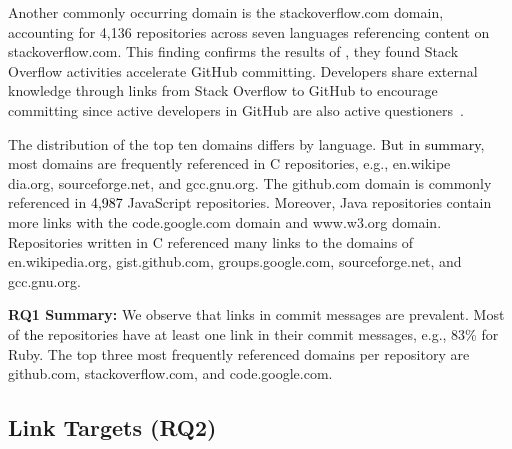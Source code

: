 \documentclass[smallextended]{svjour3}       %
\newcommand{\fix}[1]{\textcolor{black}{#1}}
\begin{document}
Another commonly occurring domain is the \textsf{stackoverflow.com} domain, accounting for 4,136 repositories across seven languages referencing content on \textsf{stackoverflow.com}. This finding confirms the results of \cite{vasilescu2013stackoverflow}, they found Stack Overflow activities accelerate GitHub committing. Developers share external knowledge through links from Stack Overflow to GitHub to encourage committing since active developers in GitHub are also active questioners~\citep{xiong2017mining}.

The distribution of the top ten domains differs by language. But in \fix{summary}, most domains are frequently referenced in C repositories, e.g., \textsf{en.wikipe\\dia.org}, \textsf{sourceforge.net}, and \textsf{gcc.gnu.org}. The \textsf{github.com} domain is commonly referenced in \fix{4,987} JavaScript repositories. Moreover, Java repositories contain more links with the \textsf{code.google.com} domain and \textsf{www.w3.org} domain. Repositories written in C referenced many links to the domains of \textsf{en.wikipedia.org}, \textsf{gist.github.com}, \textsf{groups.google.com}, \textsf{sourceforge.net}, and \textsf{gcc.gnu.org}.



\begin{tcolorbox}
\textbf{RQ1 Summary:} 
We observe that links in commit messages are prevalent. Most of \fix{the} repositories have at least one link in their commit messages, e.g., 83\% for Ruby. The top three most frequently referenced domains per repository are \textsf{github.com}, \textsf{stackoverflow.com}, and \textsf{code.google.com}.
\end{tcolorbox}








\subsection{Link Targets (RQ2)}
\end{document}
